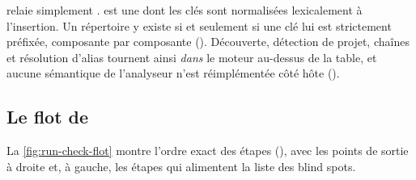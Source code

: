  relaie simplement .  est une  dont les clés sont normalisées lexicalement à l'insertion. Un répertoire y \og existe\fg{} si et seulement si une clé lui est strictement préfixée, composante par composante (). Découverte, détection de projet, chaînes  et résolution d'alias tournent ainsi \emph{dans} le moteur au-dessus de la table, et aucune sémantique de l'analyseur n'est réimplémentée côté hôte ().

\subsection{Le flot de }

La \cref{fig:run-check-flot} montre l'ordre exact des étapes (), avec les points de sortie  à droite et, à gauche, les étapes qui alimentent la liste des blind spots.


